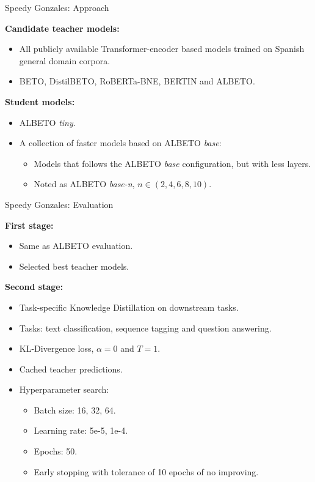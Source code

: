 \documentclass[aspectratio=169,xcolor=dvipsnames]{beamer}
\begin{document}
\begin{frame}{Speedy Gonzales: Approach}

\textbf{Candidate teacher models:}
\begin{itemize}
    \item All publicly available Transformer-encoder based models trained on Spanish general domain corpora.
    \item BETO, DistilBETO, RoBERTa-BNE, BERTIN and ALBETO.
\end{itemize}

\vspace{0.5cm}

\textbf{Student models:}
\begin{itemize}
    \item ALBETO \textit{tiny}.
    \item A collection of faster models based on ALBETO \textit{base}:
    \begin{itemize}
        \item Models that follows the ALBETO \textit{base} configuration, but with less layers.
        \item Noted as ALBETO \textit{base-n}, $n \in (2, 4, 6, 8, 10)$.
    \end{itemize}
\end{itemize}

\end{frame}
\begin{frame}{Speedy Gonzales: Evaluation}

\textbf{First stage:}
\begin{itemize}
    \item Same as ALBETO evaluation.
    \item Selected best teacher models.
\end{itemize}

\textbf{Second stage:}
\begin{itemize}
    \item Task-specific Knowledge Distillation on downstream tasks.
    \item Tasks: text classification, sequence tagging and question answering.
    \item KL-Divergence loss, $\alpha = 0$ and $T = 1$. 
    \item Cached teacher predictions.
    \item Hyperparameter search:
    \begin{itemize}
        \item Batch size: 16, 32, 64.
        \item Learning rate: 5e-5, 1e-4.
        \item Epochs: 50.
        \item Early stopping with tolerance of 10 epochs of no improving.
    \end{itemize}
\end{itemize}

\end{frame}
\end{document}
